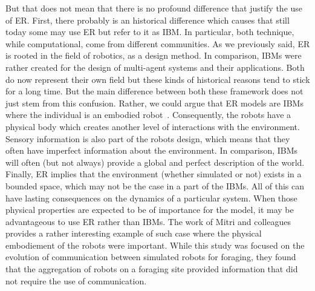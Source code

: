     But that does not mean that there is no profound difference that justify the use of ER. First, there probably is an historical difference which causes that still today some may use ER but refer to it as IBM. In particular, both technique, while computational, come from different communities. As we previously said, ER is rooted in the field of robotics, as a design method. In comparison, IBMs were rather created for the design of multi-agent systems and their applications. Both do now represent their own field but these kinds of historical reasons tend to stick for a long time. But the main difference between both these framework does not just stem from this confusion. Rather, we could argue that ER models are IBMs where the individual is an embodied robot~\parencite{Mitri2012}. Consequently, the robots have a physical body which creates another level of interactions with the environment. Sensory information is also part of the robots design, which means that they often have imperfect information about the environment. In comparison, IBMs will often (but not always) provide a global and perfect description of the world. Finally, ER implies that the environment (whether simulated or not) exists in a bounded space, which may not be the case in a part of the IBMs. All of this can have lasting consequences on the dynamics of a particular system. When those physical properties are expected to be of importance for the model, it may be advantageous to use ER rather than IBMs. The work of Mitri and colleagues~\parencite{Mitri2009} provides a rather interesting example of such case where the physical embodiement of the robots were important. While this study was focused on the evolution of communication between simulated robots for foraging, they found that the aggregation of robots on a foraging site provided information that did not require the use of communication.

